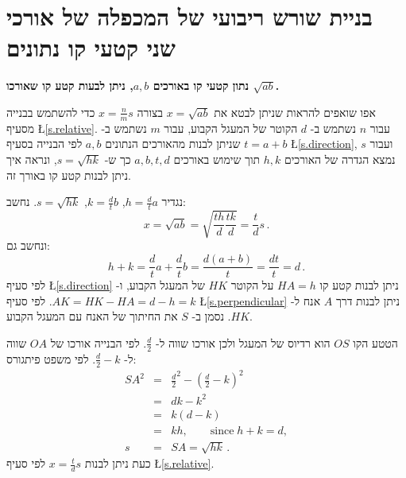 \documentclass[12pt,a4paper]{article}
\newcommand*{\disfrac}[2]{\displaystyle\frac{#1}{#2}}
\begin{document}
\section{%
בניית שורש ריבועי של המכפלה של אורכי שני קטעי קו נתונים%
}\label{s.root}

\textbf{%
נתון קטעי קו באורכים
$a,b$,
ניתן לבעות קטע קו שאורכו
$\sqrt{ab}$.}

אפו שואפים להראות שניתן לבטא את
$x=\sqrt{ab}$
בצורה
$x=\frac{n}{m}s$
כדי להשתמש בבנייה מסעיף
\L{\ref{s.relative}}.
עבור
$n$
נשתמש ב-%
$d$
הקוטר של המעגל הקבוע, עבור
$m$
נשתמש ב-%
$t=a+b$
שניתן לבנות מהאורכים הנתונים
$a,b$
לפי הבנייה בסעיף
\L{\ref{s.direction}},
ועבור
$s$
נמצא הגדרה של האורכים
$h,k$
תוך שימוש באורכים
$a,b,t,d$
כך ש-%
$s=\sqrt{hk}$,
ונראה איך ניתן לבנות קטע קו באורך זה.

נגדיר
$h=\frac{d}{t}a$, $k=\frac{d}{t}b$, $s=\sqrt{hk}$.
נחשב:
\[
x=\sqrt{ab}=\sqrt{\frac{th}{d}\frac{tk}{d}}=\frac{t}{d}s\,.
\]
ונחשב גם: 
\[
h+k = \frac{d}{t}a + \frac{d}{t}b = \frac{d(a+b)}{t} = \frac{dt}{t} = d\,.
\]
לפי סעיף
\L{\ref{s.direction}}
ניתן לבנות קטע קו
$HA= h$
על הקוטר
$HK$
של המעגל הקבוע, ו-%
$AK=HK-HA=d-h=k$.
לפי סעיף
\L{\ref{s.perpendicular}}
ניתן לבנות דרך
$A$
אנח ל-%
$HK$.
נסמן ב-%
$S$
את החיתוך של האנח עם המעגל הקבוע.
\begin{center}
\vspace*{-8pt}
\vspace*{-8pt}
\end{center}
הטטע הקו
$OS$
הוא רדיוס של המעגל ולכן אורכו שווה ל-%
$\frac{d}{2}$.
לפי הבנייה אורכו של
$OA$
שווה ל-%
$\frac{d}{2}-k$.
לפי משפט פיתגורס:
\[
\renewcommand*{\arraystretch}{1.5}
\begin{array}{rcl}
SA^2 &=& \frac{d}{2}^2 - (\frac{d}{2}-k)^2\\
&=& dk - k^2\\
&=& k(d-k)\\
&=& kh,\quad\quad \textrm{since}\; h+k=d,\\
s&=&SA=\sqrt{hk}\,.
\end{array}
\]
כעת ניתן לבנות
$x=\disfrac{t}{d}s$
לפי סעיף
\L{\ref{s.relative}}.
\end{document}
